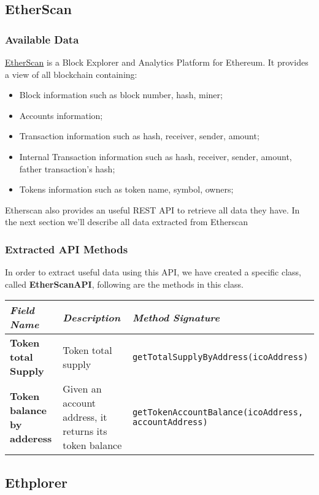 \subsection{EtherScan}
\subsubsection{Available Data}
\href{https://etherscan.io/}{EtherScan} is a Block Explorer and Analytics Platform for Ethereum.
It provides a view of all blockchain containing:
\begin{itemize}
    \item Block information such as block number, hash, miner;
    \item Accounts information;
    \item Transaction information such as hash, receiver, sender, amount;
    \item Internal Transaction information such as hash, receiver, sender, amount, father transaction's hash;
    \item Tokens information such as token name, symbol, owners;
\end{itemize}
Etherscan also provides an useful REST API to retrieve all data they have. In the next section we'll describe all data extracted from Etherscan
\subsubsection{Extracted API Methods}
In order to extract useful data using this API, we have created a specific class, called \textbf{EtherScanAPI}, following are the methods in this class.
\begin{center}
\begin{tabular}{| C{2cm} | C{4cm} | C{7cm} |} \hline
    \textit{Field Name} & \textit{Description} & \textit{Method Signature}\\ \hline 
    \textbf{Token total Supply } & Token total supply &
    \texttt{getTotalSupplyByAddress(icoAddress)}\\ \hline
    \textbf{Token balance by adderess} & Given an account address, it returns its token balance &
    \texttt{getTokenAccountBalance(icoAddress, accountAddress)}\\ \hline
\end{tabular}
\end{center}

\subsection{Ethplorer}
